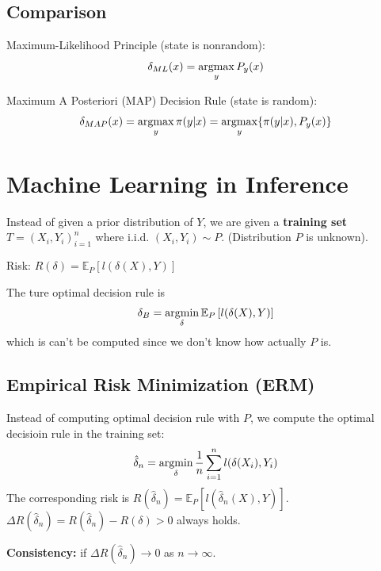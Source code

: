 \documentclass[11pt]{elegantbook}
\newcommand{\argmax}{\operatornamewithlimits{argmax}}
\newcommand{\argmin}{\operatornamewithlimits{argmin}}
\begin{document}
\section{Comparison}
Maximum-Likelihood Principle (state is nonrandom): $$\delta_{ML}(x)=\argmax_y P_y(x)$$

Maximum A Posteriori (MAP) Decision Rule (state is random): $$\delta_{MAP}(x)=\argmax_y \pi(y|x)=\argmax_y \{\pi(y|x),P_y(x)\}$$


\chapter{Machine Learning in Inference}
Instead of given a prior distribution of $Y$, we are given a \textbf{training set} $T=(X_i,Y_i)_{i=1}^n$ where i.i.d. $(X_i,Y_i)\sim P$. (Distribution $P$ is unknown).

Risk: $R(\delta)=\mathbb{E}_P\left[l(\delta(X),Y)\right]$

The ture optimal decision rule is $$\delta_B=\argmin_\delta \mathbb{E}_P\left[l(\delta(X),Y)\right]$$
which is can't be computed since we don't know how actually $P$ is.

\section{Empirical Risk Minimization (ERM)}
Instead of computing optimal decision rule with $P$, we compute the optimal decisioin rule in the training set:
$$\hat{\delta}_n=\argmin_\delta \frac{1}{n}\sum_{i=1}^nl(\delta(X_i),Y_i)$$
The corresponding risk is $R(\hat{\delta}_n)=\mathbb{E}_P\left[l(\hat{\delta}_n(X),Y)\right]$. $\Delta R(\hat{\delta}_n)=R(\hat{\delta}_n)- R(\delta)>0$ always holds.

\textbf{Consistency:} if $\Delta R(\hat{\delta}_n) \rightarrow 0$ as $n \rightarrow \infty$.
\end{document}
